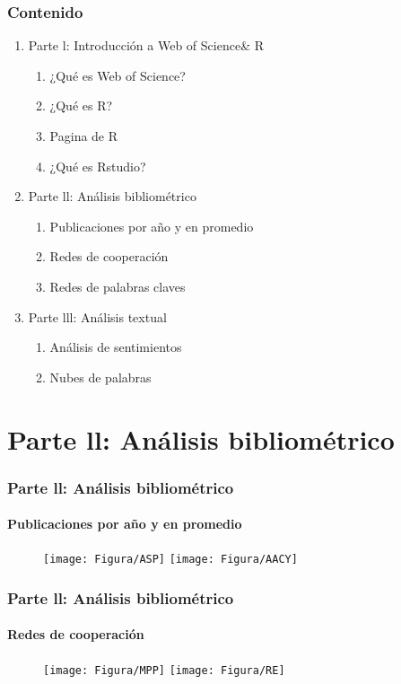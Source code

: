 \documentclass[11pt]{beamer}
\begin{document}
\begin{frame}
\frametitle{Contenido}
\begin{enumerate}[<i->]
\item Parte l: Introducción a Web of Science\& R
\begin{enumerate} [a]
\item ¿Qué es Web of Science?
\item ¿Qué es R? 
\item Pagina de R
\item  ¿Qué es Rstudio?
\end{enumerate}
\item<1-> Parte ll: Análisis bibliométrico
\begin{enumerate} [a]
\item<1-> Publicaciones por año y en promedio
\item<1-> Redes de cooperación
\item<1-> Redes de palabras claves
\end{enumerate}
\item Parte lll: Análisis textual
\begin{enumerate} [a]
\item Análisis de sentimientos
\item Nubes de palabras 
\end{enumerate}
\end{enumerate}
\end{frame}



\section{Parte ll: Análisis bibliométrico}
\begin{frame}
\frametitle{Parte ll: Análisis bibliométrico}
\framesubtitle{Publicaciones por año y en promedio}
\begin{figure}
{\texttt{[image: Figura/ASP]}} 	{\texttt{[image: Figura/AACY]}}	\\
	\end{figure}
\end{frame}

\begin{frame}
\frametitle{Parte ll: Análisis bibliométrico}
\framesubtitle{Redes de cooperación}
\begin{figure}
{\texttt{[image: Figura/MPP]}} 	{\texttt{[image: Figura/RE]}}	\\
	\end{figure}
\end{frame}
\end{document}
